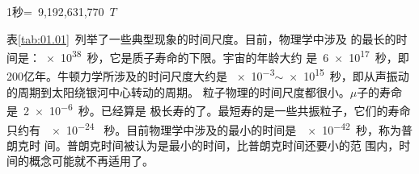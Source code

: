 \centerline{1秒=~9,192,631,770~$T$}

表\ref{tab:01.01}~列举了一些典型现象的时间尺度。目前，物理学中涉及
的最长的时间是：\num{e38}~秒，它是质子寿命的下限。宇宙的年龄大约
是~\num{6e17}~秒，即200亿年。牛顿力学所涉及的时问尺度大约是
\num{e-3}$\sim$\num{e15}~秒，即从声振动的周期到太阳绕银河中心转动的周期。
粒子物理的时间尺度都很小。$\mu$子的寿命是~\num{2e-6}~秒。已经算是
极长寿的了。最短寿的是一些共振粒子，它们的寿命只约有~\num{e-24}~
秒。目前物理学中涉及的最小的时间是~\num{e-42}~秒，称为普朗克时
间。普朗克时间被认为是最小的时间，比普朗克时间还要小的范
围内，时间的概念可能就不再适用了。